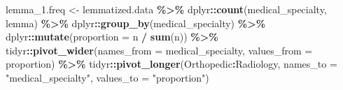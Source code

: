 \documentclass[
]{article}
\newenvironment{Shaded}{\begin{snugshade}}{\end{snugshade}}
\newcommand{\AttributeTok}[1]{\textcolor[rgb]{0.13,0.29,0.53}{#1}}
\newcommand{\FunctionTok}[1]{\textcolor[rgb]{0.13,0.29,0.53}{\textbf{#1}}}
\newcommand{\NormalTok}[1]{#1}
\newcommand{\OtherTok}[1]{\textcolor[rgb]{0.56,0.35,0.01}{#1}}
\newcommand{\SpecialCharTok}[1]{\textcolor[rgb]{0.81,0.36,0.00}{\textbf{#1}}}
\newcommand{\StringTok}[1]{\textcolor[rgb]{0.31,0.60,0.02}{#1}}
\begin{document}
\begin{Shaded}
\begin{Highlighting}[]
\NormalTok{lemma\_1.freq }\OtherTok{\textless{}{-}}\NormalTok{ lemmatized.data }\SpecialCharTok{\%\textgreater{}\%} 
\NormalTok{  dplyr}\SpecialCharTok{::}\FunctionTok{count}\NormalTok{(medical\_specialty, lemma) }\SpecialCharTok{\%\textgreater{}\%}
\NormalTok{  dplyr}\SpecialCharTok{::}\FunctionTok{group\_by}\NormalTok{(medical\_specialty) }\SpecialCharTok{\%\textgreater{}\%} 
\NormalTok{  dplyr}\SpecialCharTok{::}\FunctionTok{mutate}\NormalTok{(}\AttributeTok{proportion =}\NormalTok{ n }\SpecialCharTok{/} \FunctionTok{sum}\NormalTok{(n)) }\SpecialCharTok{\%\textgreater{}\%}
\NormalTok{  tidyr}\SpecialCharTok{::}\FunctionTok{pivot\_wider}\NormalTok{(}\AttributeTok{names\_from =}\NormalTok{ medical\_specialty, }\AttributeTok{values\_from =}\NormalTok{ proportion) }\SpecialCharTok{\%\textgreater{}\%}
\NormalTok{  tidyr}\SpecialCharTok{::}\FunctionTok{pivot\_longer}\NormalTok{(}\StringTok{\textasciigrave{}}\AttributeTok{Orthopedic}\StringTok{\textasciigrave{}}\SpecialCharTok{:}\StringTok{\textasciigrave{}}\AttributeTok{Radiology}\StringTok{\textasciigrave{}}\NormalTok{,}
               \AttributeTok{names\_to =} \StringTok{"medical\_specialty"}\NormalTok{, }\AttributeTok{values\_to =} \StringTok{"proportion"}\NormalTok{)}


\end{Highlighting}
\end{Shaded}
\end{document}
